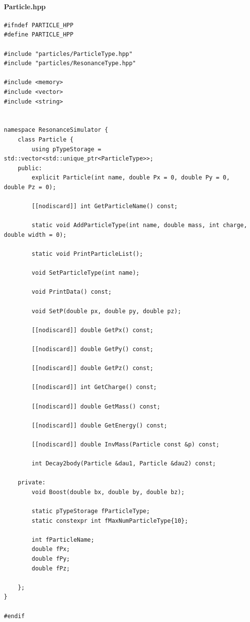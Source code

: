 \documentclass[12pt, a4paper]{article}
\begin{document}
\paragraph{Particle.hpp}
\begin{verbatim}
#ifndef PARTICLE_HPP
#define PARTICLE_HPP

#include "particles/ParticleType.hpp"
#include "particles/ResonanceType.hpp"

#include <memory>
#include <vector>
#include <string>


namespace ResonanceSimulator {
    class Particle {
        using pTypeStorage = std::vector<std::unique_ptr<ParticleType>>;
    public:
        explicit Particle(int name, double Px = 0, double Py = 0, double Pz = 0);

        [[nodiscard]] int GetParticleName() const;

        static void AddParticleType(int name, double mass, int charge, double width = 0);

        static void PrintParticleList();

        void SetParticleType(int name);

        void PrintData() const;

        void SetP(double px, double py, double pz);

        [[nodiscard]] double GetPx() const;

        [[nodiscard]] double GetPy() const;

        [[nodiscard]] double GetPz() const;

        [[nodiscard]] int GetCharge() const;

        [[nodiscard]] double GetMass() const;

        [[nodiscard]] double GetEnergy() const;

        [[nodiscard]] double InvMass(Particle const &p) const;

        int Decay2body(Particle &dau1, Particle &dau2) const;

    private:
        void Boost(double bx, double by, double bz);

        static pTypeStorage fParticleType;
        static constexpr int fMaxNumParticleType{10};

        int fParticleName;
        double fPx;
        double fPy;
        double fPz;

    };
}

#endif

\end{verbatim}
\end{document}
